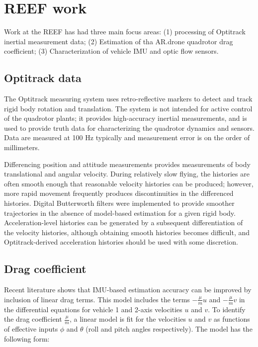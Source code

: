 \documentclass{article}
\begin{document}
\section{REEF work}

Work at the REEF has had three main focus areas: (1) processing of Optitrack inertial measurement data; (2) Estimation of tha AR.drone quadrotor drag coefficient; (3) Characterization of vehicle IMU and optic flow sensors.

\subsection{Optitrack data}

The Optitrack measuring system uses retro-reflective markers to detect and track rigid body rotation and translation. The system is not intended for active control of the quadrotor plants; it provides high-accuracy inertial measurements, and is used to provide truth data for characterizing the quadrotor dynamics and sensors. Data are measured at 100 Hz typically and measurement error is on the order of millimeters.

Differencing position and attitude measurements provides measurements of body translational and angular velocity. During relatively slow flying, the histories are often smooth enough that reasonable velocity histories can be produced; however, more rapid movement frequently produces discontinuities in the differenced histories. Digital Butterworth filters were implemented to provide smoother trajectories in the absence of model-based estimation for a given rigid body. Acceleration-level histories can be generated by a subsequent differentiation of the velocity histories, although obtaining smooth histories becomes difficult, and Optitrack-derived acceleration histories should be used with some discretion.

\subsection{Drag coefficient}

Recent literature shows that IMU-based estimation accuracy can be improved by inclusion of linear drag terms\cite{macdonald2014}. This model includes the terms $-\frac{\mu}{m}u$ and $-\frac{\mu}{m}v$ in the differential equations for vehicle 1 and 2-axis velocities $u$ and $v$. To identify the drag coefficient $\frac{\mu}{m}$, a linear model is fit for the velocities $u$ and $v$ as functions of effective inputs $\phi$ and $\theta$ (roll and pitch angles respectively). The model has the following form:
\end{document}

